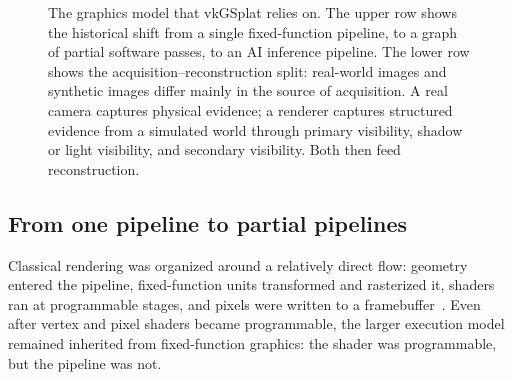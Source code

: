 \documentclass[10pt,journal,onecolumn]{IEEEtran}
\begin{document}
\begin{figure}[t]
{%
}
\caption{The graphics model that vkGSplat relies on. The upper row shows
the historical shift from a single fixed-function pipeline, to a graph
of partial software passes, to an AI inference pipeline. The lower row
shows the acquisition--reconstruction split: real-world images and
synthetic images differ mainly in the source of acquisition. A real
camera captures physical evidence; a renderer captures structured
evidence from a simulated world through primary visibility, shadow or
light visibility, and secondary visibility. Both then feed
reconstruction.}
\label{fig:graphics-evolution}
\end{figure}

\subsection{From one pipeline to partial pipelines}

Classical rendering was organized around a relatively direct flow:
geometry entered the pipeline, fixed-function units transformed and
rasterized it, shaders ran at programmable stages, and pixels were
written to a framebuffer~\cite{akenine2018}. Even after vertex and
pixel shaders became programmable, the larger execution model remained
inherited from fixed-function graphics: the shader was programmable,
but the pipeline was not.
\end{document}
